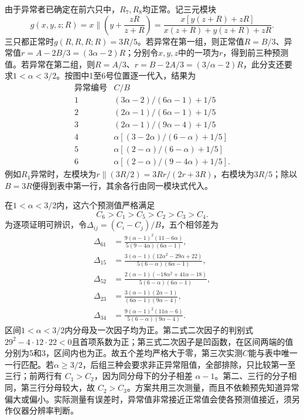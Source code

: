 \documentclass[UTF8,fontset=fandol,a4paper,11pt]{ctexart}
\begin{document}
由于异常者已确定在前六只中，$R_7,R_8$均正常。记三元模块
\[
g(x,y,z;R)=x\parallel\left(y+\frac{zR}{z+R}\right)
=\frac{x[y(z+R)+zR]}{x(z+R)+y(z+R)+zR}.
\]
三只都正常时$g(R,R,R;R)=3R/5$。若异常在第一组，则正常值$R=B/3$、异常值$r=A-2B/3=(3\alpha-2)R$；分别令$x,y,z$中的一项为$r$，得到前三种预测值。若异常在第二组，则$R=A/3$、$r=B-2A/3=(3/\alpha-2)R$，此分支还要求$1<\alpha<3/2$。按图中1至6号位置逐一代入，结果为
\[
\begin{array}{c|c}
\text{异常编号}&C/B\\\hline
1&(3\alpha-2)/(6\alpha-1)+1/5\\
2&(2\alpha-1)/(6\alpha-1)+1/5\\
3&(2\alpha-1)/(9\alpha-4)+1/5\\
4&\alpha[(3-2\alpha)/(6-\alpha)+1/5]\\
5&\alpha[(2-\alpha)/(6-\alpha)+1/5]\\
6&\alpha[(2-\alpha)/(9-4\alpha)+1/5].
\end{array}
\]
例如$R_1$异常时，左模块为$r\parallel(3R/2)=3Rr/(2r+3R)$，右模块为$3R/5$；除以$B=3R$便得到表中第一行，其余各行由同一模块式代入。

在$1<\alpha<3/2$内，这六个预测值严格满足
\[
C_6>C_1>C_5>C_2>C_3>C_4.
\]
为逐项证明可辨识，令$\Delta_{ij}=(C_i-C_j)/B$，五个相邻差为
\[
\begin{aligned}
\Delta_{61}&=\frac{9(\alpha-1)^2(11-6\alpha)}{5(9-4\alpha)(6\alpha-1)},\\
\Delta_{15}&=\frac{3(\alpha-1)(12\alpha^2-29\alpha+22)}{5(6-\alpha)(6\alpha-1)},\\
\Delta_{52}&=\frac{2(\alpha-1)(-18\alpha^2+41\alpha-18)}{5(6-\alpha)(6\alpha-1)},\\
\Delta_{23}&=\frac{3(\alpha-1)(2\alpha-1)}{(6\alpha-1)(9\alpha-4)},\\
\Delta_{34}&=\frac{9(\alpha-1)^2(11\alpha-6)}{5(6-\alpha)(9\alpha-4)}.
\end{aligned}
\]
区间$1<\alpha<3/2$内分母及一次因子均为正。第二式二次因子的判别式$29^2-4\cdot12\cdot22<0$且首项系数为正；第三式二次因子是凹函数，在区间两端的值分别为5和3，区间内也为正。故五个差均严格大于零，第三次实测$C$能与表中唯一一行匹配。若$\alpha\ge3/2$，后组三种会要求非正异常阻值，全部排除，只比较第一至三行；前两行有 $C_1>C_2$，因为同分母下的分子相差 $\alpha-1$。第二、三行的分子相同，第三行分母较大，故 $C_2>C_3$。方案共用三次测量，而且不依赖预先知道异常偏大或偏小。实际测量有误差时，异常值非常接近正常值会使各预测值接近，须另作仪器分辨率判断。
\end{document}
